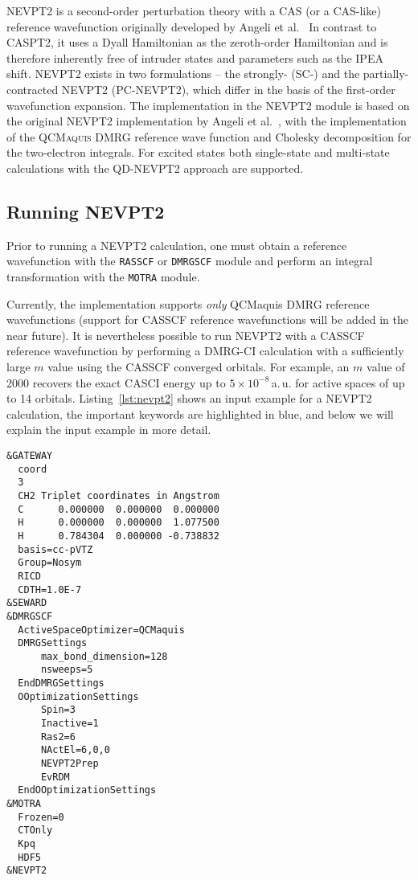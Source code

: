 \documentclass[bibliography=totoc,12pt,a4paper]{scrartcl}
\newcommand{\qcm}{\textsc{QCMaquis}}
\newcommand{\kwd}[1]{\texttt{#1}}
\begin{document}
NEVPT2 is a second-order perturbation theory with a CAS (or a CAS-like) reference wavefunction originally developed by Angeli et al.~\cite{Angeli_JChemPhys_Introduction_2001,Angeli_ChemPhysLett_Nelectron_2001,Angeli_JChemPhys_nelectron_2002,Angeli_JChemPhys_quasidegenerate_2004} In contrast to CASPT2, it uses a Dyall Hamiltonian\cite{Dyall_JChemPhys_choice_1995} as the zeroth-order Hamiltonian and is therefore inherently free of intruder states and parameters such as the IPEA shift. NEVPT2 exists in two formulations -- the strongly- (SC-) and the partially-contracted NEVPT2 (PC-NEVPT2), which differ in the basis of the first-order wavefunction expansion. The implementation in the NEVPT2 module is based on the original NEVPT2 implementation by Angeli et al.~\cite{Angeli_JChemPhys_nelectron_2002,Angeli_JChemPhys_quasidegenerate_2004}, with the implementation of the \qcm{} DMRG reference wave function and Cholesky decomposition for the two-electron integrals\cite{chimia,Freitag_JChemTheoryComput_Multireference_2017}. For excited states both single-state and multi-state calculations with the QD-NEVPT2 approach\cite{Angeli_JChemPhys_quasidegenerate_2004} are supported.

\subsection{Running NEVPT2}

Prior to running a NEVPT2 calculation, one must obtain a reference wavefunction with the \kwd{RASSCF} or \kwd{DMRGSCF} module and perform an integral transformation with the \kwd{MOTRA} module.

Currently, the implementation supports \emph{only} QCMaquis DMRG reference wavefunctions (support for CASSCF reference wavefunctions will be added in the near future). It is nevertheless possible to run NEVPT2 with a CASSCF reference wavefunction by performing a DMRG-CI calculation with a sufficiently large $m$ value using the CASSCF converged orbitals. For example, an $m$ value of 2000 recovers the exact CASCI energy up to $5\times{}10^{-8}$\,a.\,u. for active spaces of up to 14 orbitals. Listing~\ref{lst:nevpt2} shows an input example for a NEVPT2 calculation, the important keywords are highlighted in \textcolor{green!20!blue}{blue}, and below we will explain the input example in more detail.

\begin{lstlisting}[language=molcas,caption={(\texttt{009.input} in the QCMaquis test subdirectory) Input example for a one-shot NEVPT2 calculation (Singlet \ch{CH2}, 6 electrons in 6 orbitals, RICD)},label=lst:nevpt2]
&GATEWAY
  coord
  3
  CH2 Triplet coordinates in Angstrom
  C      0.000000  0.000000  0.000000
  H      0.000000  0.000000  1.077500
  H      0.784304  0.000000 -0.738832
  basis=cc-pVTZ
  Group=Nosym
  RICD
  CDTH=1.0E-7
&SEWARD
&DMRGSCF
  ActiveSpaceOptimizer=QCMaquis
  DMRGSettings
      max_bond_dimension=128
      nsweeps=5
  EndDMRGSettings
  OOptimizationSettings
      Spin=3
      Inactive=1
      Ras2=6
      NActEl=6,0,0
      NEVPT2Prep
      EvRDM
  EndOOptimizationSettings
&MOTRA
  Frozen=0
  CTOnly
  Kpq
  HDF5
&NEVPT2
\end{lstlisting}
\end{document}
